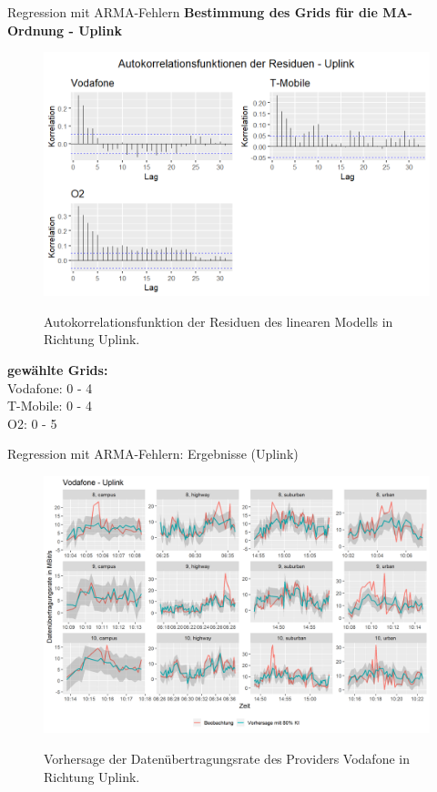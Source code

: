 \begin{frame}{Regression mit ARMA-Fehlern}
	\textbf{Bestimmung des Grids für die MA-Ordnung - Uplink}
	\noindent\begin{minipage}{0.6\textwidth}%
		\begin{figure}
			\includegraphics[scale=0.35]{plots/arima/uplink/res_acf}\\
			\caption{Autokorrelationsfunktion der Residuen des linearen Modells in Richtung Uplink.}
			\label{res_acf_ul}
		\end{figure}
	\end{minipage}%
	\hfill%
	\begin{minipage}{0.4\textwidth}\raggedleft
		\vspace{1.3cm}
		\textbf{gewählte Grids:}\\
		Vodafone: 0 - 4 \\
		T-Mobile: 0 - 4 \\
		O2: 0 - 5 \\
	\end{minipage}
\end{frame}

\begin{frame}{Regression mit ARMA-Fehlern: Ergebnisse (Uplink)}
	\begin{figure}
		\centering
		\includegraphics[scale=0.38]{plots/arima/uplink/vodafone_predictions}\\
		\caption{Vorhersage der Datenübertragungsrate des Providers Vodafone in Richtung Uplink.}
		\label{vodafone_predictions_ul}
	\end{figure}
\end{frame}


